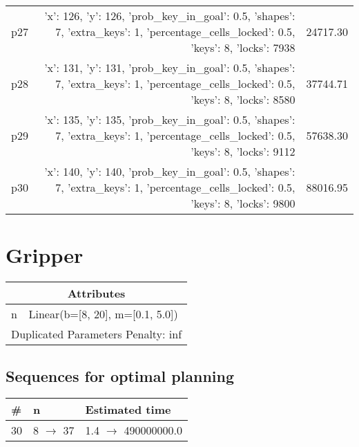 \documentclass{article}
\begin{document}
\begin{center}
\begin{tabular}{@{}l|r|r@{}}
  p27&{'x': 126, 'y': 126, 'prob\_key\_in\_goal': 0.5, 'shapes': 7, 'extra\_keys': 1, 'percentage\_cells\_locked': 0.5, 'keys': 8, 'locks': 7938}&24717.30\\
  p28&{'x': 131, 'y': 131, 'prob\_key\_in\_goal': 0.5, 'shapes': 7, 'extra\_keys': 1, 'percentage\_cells\_locked': 0.5, 'keys': 8, 'locks': 8580}&37744.71\\
  p29&{'x': 135, 'y': 135, 'prob\_key\_in\_goal': 0.5, 'shapes': 7, 'extra\_keys': 1, 'percentage\_cells\_locked': 0.5, 'keys': 8, 'locks': 9112}&57638.30\\
  p30&{'x': 140, 'y': 140, 'prob\_key\_in\_goal': 0.5, 'shapes': 7, 'extra\_keys': 1, 'percentage\_cells\_locked': 0.5, 'keys': 8, 'locks': 9800}&88016.95
                            \end{tabular}
                            \end{center}
                    
                            \newpage \section{Gripper}
                    \begin{center}
                    \begin{tabular}{@{}p{}p{}@{}}
                    \multicolumn{2}{c}{\bf \large Attributes}\\\midrule
                    n & Linear(b=[8, 20], m=[0.1, 5.0]) \\\midrule
                    \multicolumn{2}{l}{Duplicated Parameters Penalty: inf}
                    \end{tabular}
                    \end{center}
                
                            \subsection*{Sequences for optimal planning}

                            \begin{center}
                            \begin{tabular}{@{}l|l|l@{}}
                            \# & n & Estimated time\\\midrule
                            30&8 $\rightarrow$ 37&1.4 $\rightarrow$ 490000000.0
                            \end{tabular}
                            \end{center}
                    
\end{document}
